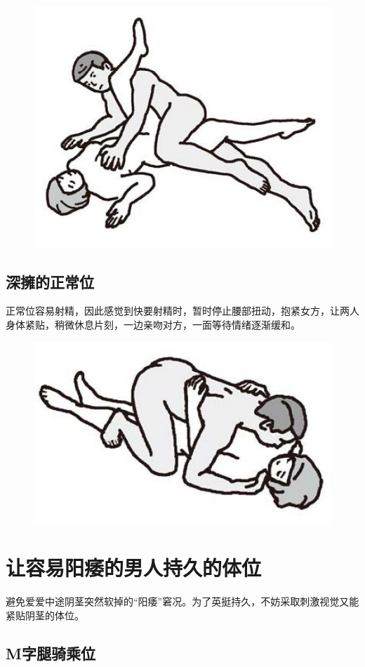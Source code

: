 \documentclass[12pt,UTF8]{ctexbook}
\begin{document}
\begin{figure}[htbp]
	\centering
	\includegraphics[width=0.7\linewidth]{tw3}
	\caption{}
	\label{fig:1}
\end{figure}

\subsection{深擁的正常位}

正常位容易射精，因此感觉到快要射精时，暂时停止腰部扭动，抱紧女方，让两人身体紧贴，稍微休息片刻，一边亲吻对方，一面等待情绪逐渐缓和。

\begin{figure}[htbp]
	\centering
	\includegraphics[width=0.7\linewidth]{tw4}
	\caption{}
	\label{fig:1}
\end{figure}

\section{让容易阳痿的男人持久的体位}

避免爱爱中途阴茎突然软掉的“阳痿”窘况。为了英挺持久，不妨采取刺激视觉又能紧贴阴茎的体位。

\subsection{M字腿骑乘位}
\end{document}
